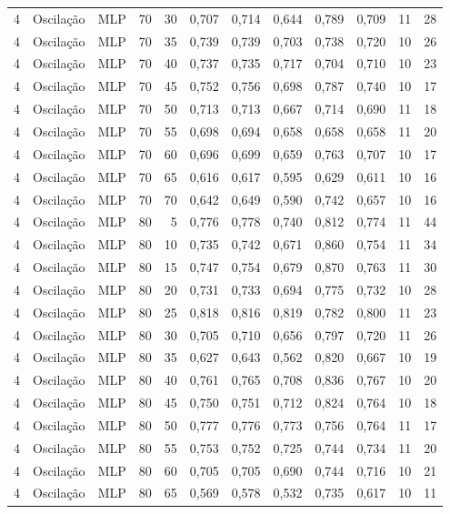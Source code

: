 \begin{longtable}{@{}rllrrrrrrrrr@{}}
4 & Oscilação & MLP & 70 & 30 & 0,707 & 0,714 & 0,644 & 0,789 & 0,709 & 11 & 28 \\
4 & Oscilação & MLP & 70 & 35 & 0,739 & 0,739 & 0,703 & 0,738 & 0,720 & 10 & 26 \\
4 & Oscilação & MLP & 70 & 40 & 0,737 & 0,735 & 0,717 & 0,704 & 0,710 & 10 & 23 \\
4 & Oscilação & MLP & 70 & 45 & 0,752 & 0,756 & 0,698 & 0,787 & 0,740 & 10 & 17 \\
4 & Oscilação & MLP & 70 & 50 & 0,713 & 0,713 & 0,667 & 0,714 & 0,690 & 11 & 18 \\
4 & Oscilação & MLP & 70 & 55 & 0,698 & 0,694 & 0,658 & 0,658 & 0,658 & 11 & 20 \\
4 & Oscilação & MLP & 70 & 60 & 0,696 & 0,699 & 0,659 & 0,763 & 0,707 & 10 & 17 \\
4 & Oscilação & MLP & 70 & 65 & 0,616 & 0,617 & 0,595 & 0,629 & 0,611 & 10 & 16 \\
4 & Oscilação & MLP & 70 & 70 & 0,642 & 0,649 & 0,590 & 0,742 & 0,657 & 10 & 16 \\
4 & Oscilação & MLP & 80 & 5 & 0,776 & 0,778 & 0,740 & 0,812 & 0,774 & 11 & 44 \\
4 & Oscilação & MLP & 80 & 10 & 0,735 & 0,742 & 0,671 & 0,860 & 0,754 & 11 & 34 \\
4 & Oscilação & MLP & 80 & 15 & 0,747 & 0,754 & 0,679 & 0,870 & 0,763 & 11 & 30 \\
4 & Oscilação & MLP & 80 & 20 & 0,731 & 0,733 & 0,694 & 0,775 & 0,732 & 10 & 28 \\
4 & Oscilação & MLP & 80 & 25 & 0,818 & 0,816 & 0,819 & 0,782 & 0,800 & 11 & 23 \\
4 & Oscilação & MLP & 80 & 30 & 0,705 & 0,710 & 0,656 & 0,797 & 0,720 & 11 & 26 \\
4 & Oscilação & MLP & 80 & 35 & 0,627 & 0,643 & 0,562 & 0,820 & 0,667 & 10 & 19 \\
4 & Oscilação & MLP & 80 & 40 & 0,761 & 0,765 & 0,708 & 0,836 & 0,767 & 10 & 20 \\
4 & Oscilação & MLP & 80 & 45 & 0,750 & 0,751 & 0,712 & 0,824 & 0,764 & 10 & 18 \\
4 & Oscilação & MLP & 80 & 50 & 0,777 & 0,776 & 0,773 & 0,756 & 0,764 & 11 & 17 \\
4 & Oscilação & MLP & 80 & 55 & 0,753 & 0,752 & 0,725 & 0,744 & 0,734 & 11 & 20 \\
4 & Oscilação & MLP & 80 & 60 & 0,705 & 0,705 & 0,690 & 0,744 & 0,716 & 10 & 21 \\
4 & Oscilação & MLP & 80 & 65 & 0,569 & 0,578 & 0,532 & 0,735 & 0,617 & 10 & 11 \\

\end{longtable}
